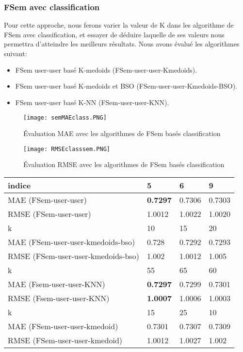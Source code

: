 \subsubsection*{FSem avec classification}
Pour cette approche, nous ferons varier la valeur de K dans les algorithme de FSem avec classification, et essayer de déduire laquelle de ses valeurs nous permettra d’atteindre les meilleurs résultats.
Nous avons évalué les algorithmes suivant:
\begin{itemize}
	\item  FSem user-user basé K-medoids (FSem-user-user-Kmedoids).
	\item  FSem user-user basé K-medoids et BSO (FSem-user-user-Kmedoids-BSO).
	\item  FSem user-user basé K-NN (FSem-user-user-KNN).
\end{itemize}
\begin{figure}[H]
	\centering
	\texttt{[image: semMAEclass.PNG]}
	\caption{Évaluation MAE avec les algorithmes de FSem basés classification}
	\label{fig:semMAEclass}
\end{figure}

\begin{figure}[H]
	\centering
	\texttt{[image: RMSEclasssem.PNG]}
	\caption{Évaluation RMSE avec les algorithmes de FSem basés classification}
	\label{fig:RMSEclasssem}
\end{figure}

\begin{center}\label{tab2}
	\begin{tabularx}{\textwidth}{|p{5.1cm}|p{3.2cm}|p{3.2cm}|p{3.3cm}|}
	\hline
	indice & 5 & 6 & 9 \\ \hline
	MAE  (FSem-user-user) & \textbf{0.7297} & 0.7306 & 0.7303 \\ \hline
	RMSE (FSem-user-user) & 1.0012 & 1.0022 & 1.0020\\ \hline	
	\hline
	k & 10 & 15 & 20 \\ \hline
	MAE  (FSem-user-user-kmedoids-bso) & 0.728 & 0.7292 & 0.7293 \\ \hline
	RMSE (FSem-user-user-kmedoids-bso) & 1.002 & 1.0012 & 1.005 \\ \hline\hline
	k & 55 & 65 & 60 \\ \hline
	MAE  (Fsem-user-user-KNN) & \textbf{0.7297} & 0.7299 & 0.7301 \\ \hline
	RMSE (Fsem-user-user-KNN) & \textbf{1.0007} & 1.0006 & 1.0003 \\ \hline\hline
	k & 15 & 25 & 10 \\ \hline
	MAE  (FSem-user-user-kmedoid) & 0.7301 & 0.7307 & 0.7309 \\ \hline
	RMSE (FSem-user-user-kmedoid) & 1.0012 & 1.0027 & 1.002 \\ \hline
\end{tabularx}
\end{center}

